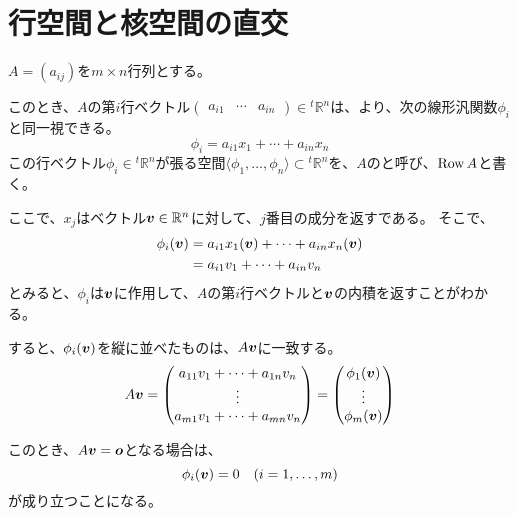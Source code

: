 \documentclass[../../../topic_linear-algebra]{subfiles}
\begin{document}
\sectionline
\section{行空間と核空間の直交}

$A = (a_{ij})$を$m \times n$行列とする。

このとき、$A$の第$i$行ベクトル$\begin{pmatrix} a_{i1} & \cdots & a_{in} \end{pmatrix} \in {}^t\mathbb{R}^n$は、より、次の線形汎関数$\phi_i$と同一視できる。
\begin{equation*}
  \phi_i = a_{i1} x_1 + \cdots + a_{in} x_n
\end{equation*}
この行ベクトル$\phi_i \in {}^t\mathbb{R}^n$が張る空間$\langle \phi_1, \ldots, \phi_n \rangle \subset {}^t\mathbb{R}^n$を、$A$のと呼び、$\operatorname{Row} A$と書く。

\br

ここで、$x_j$はベクトル$\vb*{v} \in \mathbb{R}^n$に対して、$j$番目の成分を返すである。
そこで、
\begin{align*}
  \phi_i(\vb*{v}) &= a_{i1} x_1(\vb*{v}) + \cdots + a_{in} x_n(\vb*{v}) \\
  &= a_{i1} v_1 + \cdots + a_{in} v_n
\end{align*}
とみると、$\phi_i$は$\vb*{v}$に作用して、$A$の第$i$行ベクトルと$\vb*{v}$の内積を返すことがわかる。

\br

すると、$\phi_i(\vb*{v})$を縦に並べたものは、$A\vb*{v}$に一致する。
\begin{equation*}
  A\vb*{v} = \begin{pmatrix}
    a_{11} v_1 + \cdots + a_{1n} v_n \\
    \vdots \\
    a_{m1} v_1 + \cdots + a_{mn} v_n
  \end{pmatrix} = \begin{pmatrix}
    \phi_1(\vb*{v}) \\
    \vdots \\
    \phi_m(\vb*{v})
  \end{pmatrix}
\end{equation*}

\br

このとき、$A\vb*{v} = \vb*{o}$となる場合は、
\begin{equation*}
  \phi_i(\vb*{v}) = 0 \quad (i = 1, \ldots, m)
\end{equation*}
が成り立つことになる。
\end{document}
